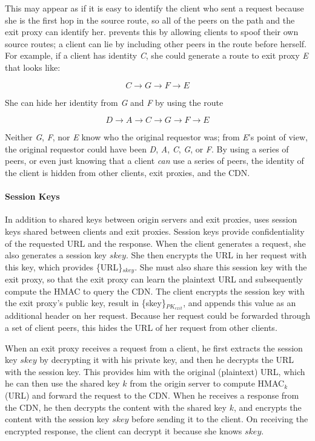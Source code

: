 This may appear as if it is easy to identify the client who sent a request because she is the first hop in the 
source route, so all of the peers on the path and the exit proxy can identify her.  \system{} prevents this by 
allowing clients to spoof their own source routes; a client can lie by including other peers in the route before 
herself.  For example, if a client has identity {\it C}, she could generate a route to exit proxy {\it E} that looks 
like: 

\[C \rightarrow G \rightarrow F \rightarrow E\] 

\noindent She can hide her identity from {\it G} and {\it F} by using the route 

\[D \rightarrow A \rightarrow C \rightarrow G \rightarrow F \rightarrow E\]  

\noindent Neither {\it G}, {\it F}, nor {\it E} know who the original requestor was; from {\it E}'s point of 
view, the original requestor could have been {\it D}, {\it A}, {\it C}, {\it G}, or {\it F}.  By using a series of 
peers, or even just knowing that a client {\it can} use a series of peers, the identity of the client is 
hidden from other clients, exit proxies, and the CDN. 

\paragraph{Session Keys}
In addition to shared keys between origin servers and exit proxies, \system{} uses session keys shared 
between clients and exit proxies.  Session keys provide confidentiality of the requested URL and the 
response.  When the client generates a request, she also generates a session key $skey$.  She then encrypts 
the URL in her request with this key, which provides \{URL\}$_{skey}$.  She must also share this session key 
with the exit proxy, so that the exit proxy can learn the plaintext URL and subsequently compute the HMAC to 
query the CDN.  The client encrypts the session key with the exit proxy's public key, result in \{skey\}$_{PK_{exit}}$, 
and appends this value as an additional header on her request.  Because her request could be forwarded through 
a set of client peers, this hides the URL of her request from other clients.

When an exit proxy receives a request from a client, he first extracts the session key $skey$ by decrypting it with 
his private key, and then he decrypts the URL with the session key.  This provides him with the original (plaintext) 
URL, which he can then use the shared key $k$ from the origin server to compute HMAC$_k$(URL) and forward the request 
to the CDN.  When he receives a response from the CDN, he then decrypts the content with the shared key $k$, and 
encrypts the content with the session key $skey$ before sending it to the client.  On receiving the encrypted response, 
the client can decrypt it because she knows $skey$.

